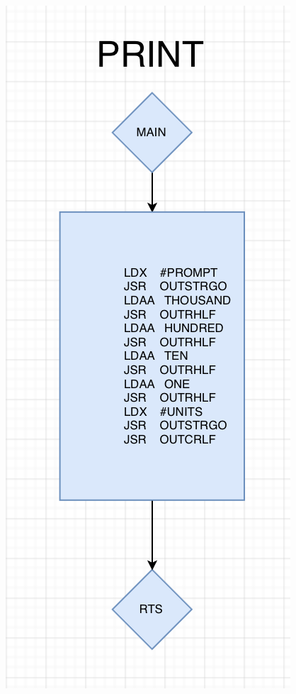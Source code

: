 \documentclass[12pt]{report}
\begin{document}
\begin{center}
     \includegraphics[scale=0.66]{print.PNG}
     \newpage{}
	\end{center}
\end{document}
